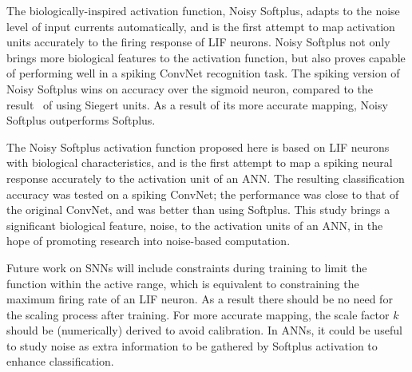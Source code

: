 	The biologically-inspired activation function, Noisy Softplus, adapts to the noise level of input currents automatically, and is the first attempt to map activation units accurately to the firing response of LIF neurons.
	Noisy Softplus not only brings more biological features to the activation function, but also proves capable of performing well in a spiking ConvNet recognition task.
	The spiking version of Noisy Softplus wins on accuracy over the sigmoid neuron, compared to the result~\cite{Stromatias2015scalable} of using Siegert units.
	As a result of its more accurate mapping, Noisy Softplus outperforms Softplus.
	
	The Noisy Softplus activation function proposed here is based on LIF neurons with biological characteristics, and is the first attempt to map a spiking neural response accurately to the activation unit of an ANN.
	The resulting classification accuracy was tested on a spiking ConvNet; the performance was close to that of the original ConvNet, and was better than using Softplus.
	This study brings a significant biological feature, noise, to the activation units of an ANN, in the hope of promoting research into noise-based computation.
	
	Future work on SNNs will include constraints during training to limit the function within the active range, which is equivalent to constraining the maximum firing rate of an LIF neuron.
	As a result there should be no need for the scaling process after training.
	For more accurate mapping, the scale factor $k$ should be (numerically) derived to avoid calibration.
	In ANNs, it could be useful to study noise as extra information to be gathered by Softplus activation to enhance classification.